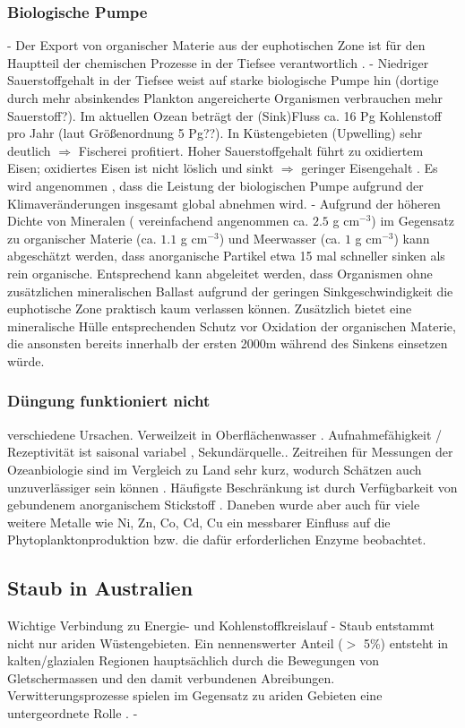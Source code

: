 \documentclass[12pt,a4paper,onecolumn]{scrartcl}
\begin{document}
\subsubsection{Biologische Pumpe} \label{sec:biopump}
- Der Export von organischer Materie aus der euphotischen Zone ist für den Hauptteil der chemischen Prozesse in der Tiefsee verantwortlich \citep{Emerson.2009}. - Niedriger Sauerstoffgehalt in der Tiefsee weist auf starke biologische Pumpe hin (dortige durch mehr absinkendes Plankton angereicherte Organismen verbrauchen mehr Sauerstoff?). Im aktuellen Ozean beträgt der (Sink)Fluss ca. 16 Pg Kohlenstoff pro Jahr \citep{Falkowski.1998} (laut \citet{Emerson.2009} Größenordnung 5  Pg??). In Küstengebieten (Upwelling) sehr deutlich $\Rightarrow$ Fischerei profitiert. Hoher Sauerstoffgehalt führt zu oxidiertem Eisen; oxidiertes Eisen ist nicht löslich und sinkt $\Rightarrow$ geringer Eisengehalt \citep{Falkowski.1998}. Es wird angenommen , dass die Leistung der biologischen Pumpe aufgrund der Klimaveränderungen insgesamt global abnehmen wird. - Aufgrund der höheren Dichte von Mineralen ( vereinfachend angenommen ca. $2.5$ g cm$^{-3}$) im Gegensatz zu organischer Materie (ca. $1.1$ g cm$^{-3}$)  und Meerwasser (ca. $1$ g cm$^{-3}$) kann abgeschätzt werden, dass anorganische Partikel etwa 15 mal schneller sinken als rein organische. Entsprechend kann abgeleitet werden, dass Organismen ohne zusätzlichen mineralischen Ballast aufgrund der geringen Sinkgeschwindigkeit die euphotische Zone praktisch kaum verlassen können. Zusätzlich bietet eine mineralische Hülle entsprechenden Schutz vor Oxidation der organischen Materie, die ansonsten bereits innerhalb der ersten 2000m während des Sinkens einsetzen würde\citep{Emerson.2009}.
\subsubsection{Düngung funktioniert nicht}
verschiedene Ursachen. Verweilzeit in Oberflächenwasser \citep{Hayes.2015}. Aufnahmefähigkeit / Rezeptivität ist saisonal variabel \citep{Gabric.2016}, Sekundärquelle.\citep{Falkowski.1998}. Zeitreihen für Messungen der Ozeanbiologie sind im Vergleich zu Land sehr kurz, wodurch Schätzen auch unzuverlässiger sein können \citep{Falkowski.1998}. Häufigste Beschränkung ist durch Verfügbarkeit von gebundenem anorganischem Stickstoff \citep{Falkowski.1998}. Daneben wurde aber auch für viele weitere Metalle wie Ni, Zn, Co, Cd, Cu ein messbarer Einfluss auf die Phytoplanktonproduktion bzw. die dafür erforderlichen Enzyme beobachtet.
\subsection{Staub in Australien} \label{sec:Staub}
Wichtige Verbindung zu Energie- und Kohlenstoffkreislauf \citep{Shao.2011} - Staub entstammt nicht nur ariden Wüstengebieten. Ein nennenswerter Anteil ($>$ 5\%) entsteht in kalten/glazialen Regionen hauptsächlich durch die Bewegungen von Gletschermassen und den damit verbundenen Abreibungen. Verwitterungsprozesse spielen im Gegensatz zu ariden Gebieten eine untergeordnete Rolle \citep{Marx.2018}. -
\end{document}
